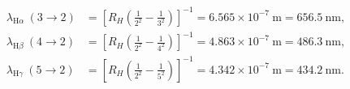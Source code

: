 \documentclass[12pt,a4paper]{article}
\begin{document}
\[
    \begin{aligned}
        \lambda_{\mathrm{H}\alpha}\ (3\to2)
        &= \left[R_H\left(\frac{1}{2^2}-\frac{1}{3^2}\right)\right]^{-1}
        = 6.565\times10^{-7}\ \si{\metre}
        = 656.5\ \si{\nano\metre},\\
        \lambda_{\mathrm{H}\beta}\ (4\to2)
        &= \left[R_H\left(\frac{1}{2^2}-\frac{1}{4^2}\right)\right]^{-1}
        = 4.863\times10^{-7}\ \si{\metre}
        = 486.3\ \si{\nano\metre},\\
        \lambda_{\mathrm{H}\gamma}\ (5\to2)
        &= \left[R_H\left(\frac{1}{2^2}-\frac{1}{5^2}\right)\right]^{-1}
        = 4.342\times10^{-7}\ \si{\metre}
        = 434.2\ \si{\nano\metre}.
    \end{aligned}
\]
\end{document}

